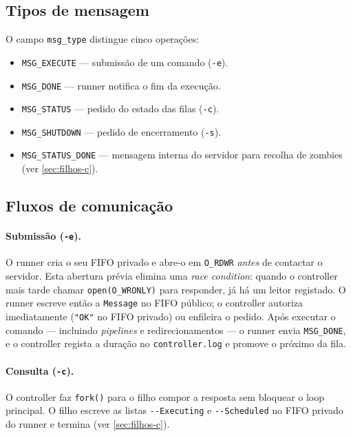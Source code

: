 \documentclass[runningheads,11pt]{llncs}
\begin{document}
        \subsection{Tipos de mensagem}

        O campo \texttt{msg\_type} distingue cinco operações:

        \begin{itemize}
        \item \texttt{MSG\_EXECUTE} — submissão de um comando (\texttt{-e}).
        \item \texttt{MSG\_DONE} — runner notifica o fim da execução.
        \item \texttt{MSG\_STATUS} — pedido do estado das filas (\texttt{-c}).
        \item \texttt{MSG\_SHUTDOWN} — pedido de encerramento (\texttt{-s}).
        \item \texttt{MSG\_STATUS\_DONE} — mensagem interna do servidor para recolha de zombies (ver \ref{sec:filhos-c}).
        \end{itemize}

        \subsection{Fluxos de comunicação}

        \paragraph{Submissão (\texttt{-e}).} O runner cria o seu FIFO privado e abre-o em \texttt{O\_RDWR} \textit{antes} de contactar o servidor. Esta abertura prévia elimina uma \textit{race condition}: quando o controller mais tarde chamar \texttt{open(O\_WRONLY)} para responder, já há um leitor registado. O runner escreve então a \texttt{Message} no FIFO público; o controller autoriza imediatamente (\texttt{"OK"} no FIFO privado) ou enfileira o pedido. Após executar o comando — incluindo \textit{pipelines} e redirecionamentos — o runner envia \texttt{MSG\_DONE}, e o controller regista a duração no \texttt{controller.log} e promove o próximo da fila.

        \paragraph{Consulta (\texttt{-c}).} O controller faz \texttt{fork()} para o filho compor a resposta sem bloquear o loop principal. O filho escreve as listas \texttt{-{}-Executing} e \texttt{-{}-Scheduled} no FIFO privado do runner e termina (ver \ref{sec:filhos-c}).
\end{document}
